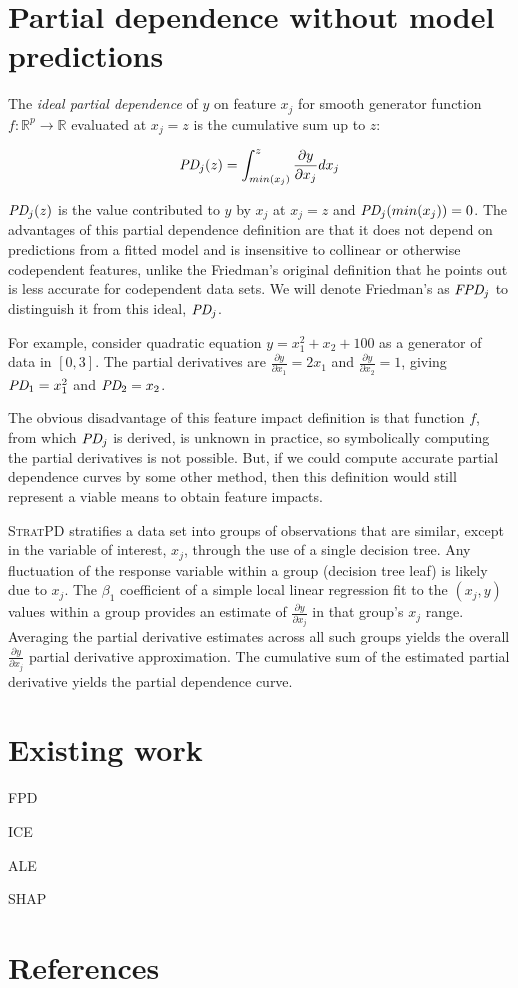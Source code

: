 \documentclass{article}
\newcommand{\spd}{\fontfamily{cmr}\textsc{\small StratPD}}
\begin{document}
\section{Partial dependence without model predictions}

 The {\em ideal partial dependence} of $y$ on feature $x_j$ for smooth generator function $f:\mathbb{R}^{p} \rightarrow \mathbb{R}$ evaluated at $x_j = z$ is the cumulative sum up to $z$:

\begin{equation}\label{eq:pd}
\text{\it PD}_j(z) = \int_{min(x_j)}^z \frac{\partial y}{\partial x_j} dx_j
\end{equation}

$\text{\it PD}_j(z)$ is the value contributed to $y$ by $x_j$ at $x_j = z$ and $\text{\it PD}_j(min(x_j))=0$. The advantages of this partial dependence definition are that it does not depend on predictions from a fitted model and is insensitive to collinear or otherwise codependent features, unlike the Friedman's original definition that he points out is less accurate for codependent data sets. We will denote Friedman's as $\text{\it FPD}_j$ to distinguish it from this ideal, $\text{\it PD}_j$.

For example, consider quadratic equation $y = x_1^2 + x_2 + 100$ as a generator of data in $[0,3]$. The partial derivatives are $\frac{\partial y}{\partial x_1} = 2 x_1$ and $\frac{\partial y}{\partial x_2} = 1$, giving $\text{\it PD}_1 = x_1^2$ and $\text{\it PD}_2 = x_2$. 

The obvious disadvantage of this feature impact definition is that function $f$, from which $\text{\it PD}_j$ is derived, is unknown in practice, so symbolically computing the partial derivatives is not possible. But, if we could compute accurate partial dependence curves by some other method, then this definition would still represent a viable means to obtain feature impacts. 

\spd{} stratifies a data set into groups of observations that are similar, except in the variable of interest, $x_j$, through the use of a single decision tree. Any fluctuation of the response variable within a group (decision tree leaf) is likely due to $x_j$.  The $\beta_1$ coefficient of a simple local linear regression fit to the $(x_j, y)$ values within a group provides an estimate of $\frac{\partial y}{\partial x_j}$ in that group's $x_j$ range. Averaging the partial derivative estimates across all such groups yields the overall $\frac{\partial y}{\partial x_j}$ partial derivative approximation. The cumulative sum of the estimated partial derivative yields the partial dependence curve. 

\section{Existing work}

FPD

ICE

ALE

SHAP

\section*{References}


\end{document}
